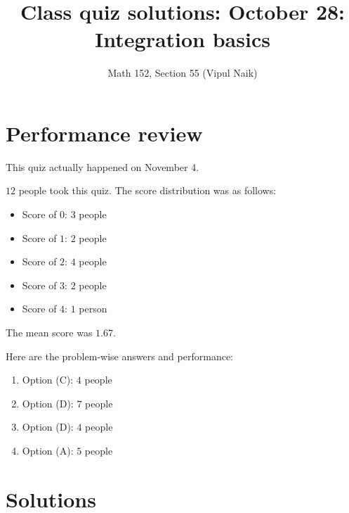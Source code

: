 \documentclass[10pt]{amsart}
\title{Class quiz solutions: October 28: Integration basics}
\author{Math 152, Section 55 (Vipul Naik)}
\begin{document}
\maketitle

\section{Performance review}

This quiz actually happened on November 4.

$12$ people took this quiz. The score distribution was as follows:

\begin{itemize}
\item Score of $0$: $3$ people
\item Score of $1$: $2$ people
\item Score of $2$: $4$ people
\item Score of $3$: $2$ people
\item Score of $4$: $1$ person
\end{itemize}

The mean score was $1.67$.

Here are the problem-wise answers and performance:

\begin{enumerate}
\item Option (C): $4$ people
\item Option (D): $7$ people
\item Option (D): $4$ people
\item Option (A): $5$ people
\end{enumerate}

\section{Solutions}
\end{document}
